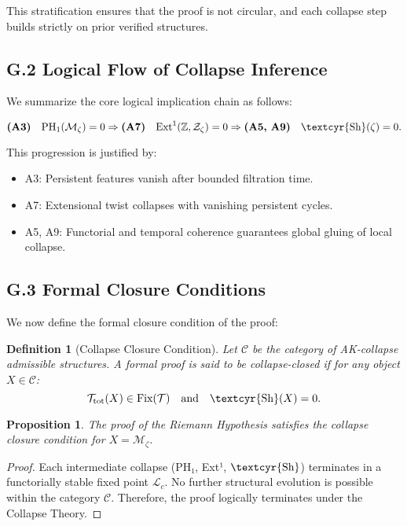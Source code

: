 \documentclass[11pt]{article}
\newtheorem{definition}[theorem]{Definition}
\newtheorem{proposition}[theorem]{Proposition}
\newcommand{\Sha}{\text{\textcyr{Sh}}}
\begin{document}
This stratification ensures that the proof is not circular, and each collapse step builds strictly on prior verified structures.

\subsection*{G.2 Logical Flow of Collapse Inference}

We summarize the core logical implication chain as follows:

\[
\textbf{(A3)}\quad \mathrm{PH}_1(\mathcal{M}_\zeta) = 0 \Rightarrow \textbf{(A7)}\quad \mathrm{Ext}^1(\mathbb{Z}, \mathcal{Z}_\zeta) = 0 \Rightarrow \textbf{(A5, A9)}\quad \Sha(\zeta) = 0.
\]

This progression is justified by:

\begin{itemize}
    \item A3: Persistent features vanish after bounded filtration time.
    \item A7: Extensional twist collapses with vanishing persistent cycles.
    \item A5, A9: Functorial and temporal coherence guarantees global gluing of local collapse.
\end{itemize}

\subsection*{G.3 Formal Closure Conditions}

We now define the formal closure condition of the proof:

\begin{definition}[Collapse Closure Condition]
Let $\mathcal{C}$ be the category of AK-collapse admissible structures.  
A formal proof is said to be \emph{collapse-closed} if for any object $X \in \mathcal{C}$:
\[
\mathcal{T}_{\mathrm{tot}}(X) \in \text{Fix}(\mathcal{T}) \quad \text{and} \quad \Sha(X) = 0.
\]
\end{definition}

\begin{proposition}
The proof of the Riemann Hypothesis satisfies the collapse closure condition for $X = \mathcal{M}_\zeta$.
\end{proposition}

\begin{proof}
Each intermediate collapse (PH₁, Ext¹, $\Sha$) terminates in a functorially stable fixed point $\mathcal{L}_c$.  
No further structural evolution is possible within the category $\mathcal{C}$.  
Therefore, the proof logically terminates under the Collapse Theory.
\end{proof}
\end{document}
